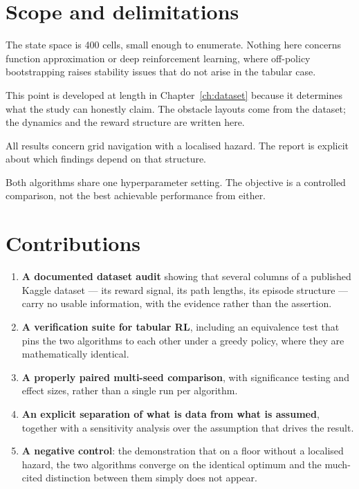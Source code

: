 \section{Scope and delimitations}

 The state space is 400 cells, small enough to enumerate. Nothing
here concerns function approximation or deep reinforcement learning, where off-policy bootstrapping
raises stability issues that do not arise in the tabular case.

 This point is developed at length in
Chapter~\ref{ch:dataset} because it determines what the study can honestly claim. The obstacle
layouts come from the dataset; the dynamics and the reward structure are written here.

 All results concern grid navigation with a localised hazard. The
report is explicit about which findings depend on that structure.

 Both algorithms share one hyperparameter setting. The objective is
a controlled comparison, not the best achievable performance from either.

\section{Contributions}

\begin{enumerate}
\item \textbf{A documented dataset audit} showing that several columns of a published Kaggle
      dataset --- its reward signal, its path lengths, its episode structure --- carry no usable
      information, with the evidence rather than the assertion.
\item \textbf{A verification suite for tabular RL}, including an equivalence test that pins the
      two algorithms to each other under a greedy policy, where they are mathematically identical.
\item \textbf{A properly paired multi-seed comparison}, with significance testing and effect
      sizes, rather than a single run per algorithm.
\item \textbf{An explicit separation of what is data from what is assumed}, together with a
      sensitivity analysis over the assumption that drives the result.
\item \textbf{A negative control}: the demonstration that on a floor without a localised hazard,
      the two algorithms converge on the identical optimum and the much-cited distinction between
      them simply does not appear.
\end{enumerate}

